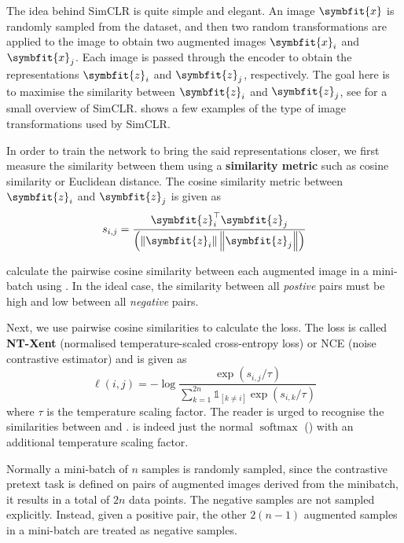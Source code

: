 The idea behind SimCLR is quite simple and elegant. An image $\symbfit{x}$ is randomly sampled from the dataset, and then two random transformations are applied to the image to obtain two augmented images $\symbfit{x}_i$ and $\symbfit{x}_j$. Each image is passed through the encoder to obtain the representations $\symbfit{z}_i$ and $\symbfit{z}_j$, respectively. The goal here is to maximise the similarity between $\symbfit{z}_i$ and $\symbfit{z}_j$, see  for a small overview of SimCLR.  shows a few examples of the type of image transformations used by SimCLR.

In order to train the network to bring the said representations closer, we first measure the similarity between them using a \textbf{similarity metric} such as cosine similarity or Euclidean distance. The cosine similarity metric between $\symbfit{z}_i$ and $\symbfit{z}_j$ is given as
\begin{equation}
\label{eqn:simclr-cosine-sim}
s_{i, j}=\frac{\symbfit{z}_{i}^{\top} \symbfit{z}_{j}} {\left(\left\|\symbfit{z}_{i}\right\|\left\|\symbfit{z}_{j}\right\|\right)}
\end{equation}

 calculate the pairwise cosine similarity between each augmented image in a mini-batch using . In the ideal case, the similarity between all \textit{postive} pairs must be high and low between all \textit{negative} pairs.

Next, we use pairwise cosine similarities to calculate the loss. The loss is called \textbf{NT-Xent} (normalised temperature-scaled cross-entropy loss) or NCE (noise contrastive estimator) and is given as
\begin{equation}
\ell(i, j)=-\log \frac{\exp \left(s_{i, j} / \tau\right)}{\sum_{k=1}^{2 n} \mathbb{1}_{[k \neq i]} \exp \left(s_{i, k} / \tau\right)}
\label{eqn:nt-xent}
\end{equation}
where $\tau$ is the temperature scaling factor. The reader is urged to recognise the similarities between  and .  is indeed just the normal $\operatorname{softmax}$ () with an additional temperature scaling factor.

Normally a mini-batch of $n$ samples is randomly sampled, since the contrastive pretext task is defined on pairs of augmented images derived from the minibatch, it results in a total of $2n$ data points. The negative samples are not sampled explicitly. Instead, given a positive pair, the other $2(n-1)$ augmented samples in a mini-batch are treated as negative samples.

